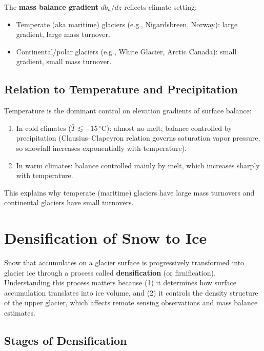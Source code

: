 \documentclass[11pt]{article}
\begin{document}
The \textbf{mass balance gradient} $db_n/dz$ reflects climate setting:
\begin{itemize}
  \item Temperate (aka maritime) glaciers (e.g., Nigardsbreen, Norway): large gradient, large mass turnover.
  \item Continental/polar glaciers (e.g., White Glacier, Arctic Canada): small gradient, small mass turnover.
\end{itemize}

\subsection{Relation to Temperature and Precipitation}

Temperature is the dominant control on elevation gradients of surface balance:
\begin{enumerate}
  \item In cold climates ($\bar{T} \lesssim -15\,^{\circ}$C): almost no melt; balance controlled by precipitation (Clausius--Clapeyron relation governs saturation vapor pressure, so snowfall increases exponentially with temperature).
  \item In warm climates: balance controlled mainly by melt, which increases sharply with temperature.
\end{enumerate}

This explains why temperate (maritime) glaciers have large mass turnovers and continental glaciers have small turnovers.

\section{Densification of Snow to Ice}

Snow that accumulates on a glacier surface is progressively transformed into glacier ice through a process called \textbf{densification} (or firnification).  Understanding this process matters because (1) it determines how surface accumulation translates into ice volume, and (2) it controls the density structure of the upper glacier, which affects remote sensing observations and mass balance estimates.

\subsection{Stages of Densification}
\end{document}
